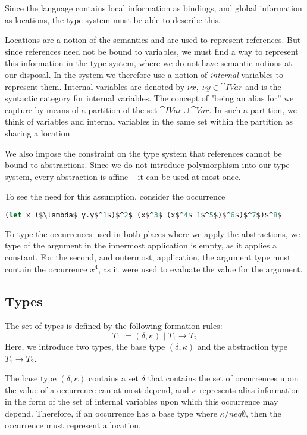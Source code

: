 \documentclass[acmsmall,sigplan]{acmart}
\begin{document}
Since the language contains local information as bindings, and global
information as locations, the type system must be able to describe
this.

Locations are a notion of the semantics and are used to represent
references. But since references need not be bound to variables, we
must find a way to represent this information in the type system,
where we do not have semantic notions at our disposal. In the system
we therefore use a notion of \emph{internal} variables to represent
them. Internal variables are denoted by $\nu x,\; \nu y\in\cat{IVar}$
and  is the syntactic category for internal variables. The
concept of "being an alias for'' we capture by means of a partition of
the set $\cat{IVar} \cup \cat{Var}$. In such a partition, we think of
variables and internal variables in the same set within the partition
as sharing a location.

We also impose the constraint on the type system that references
cannot be bound to abstractions.  Since we do not introduce
polymorphism into our type system, every abstraction is affine -- it
can be used at most once.

To see the need for this assumption, consider the occurrence
\begin{lstlisting}[language=Caml, mathescape=true]
(let x ($\lambda$ y.y$^1$)$^2$ (x$^3$ (x$^4$ 1$^5$)$^6$)$^7$)$^8$
\end{lstlisting}
To type the occurrences used in both places where we apply the
abstractions, we type of the argument in the innermost application is
empty, as it applies a constant. 
For the second, and outermost, application, the argument type must
contain the occurrence $x^4$, as it were used to evaluate the value
for the argument. 

\subsection{Types}\label{sec:types}

The set of types  is defined by the following formation rules:
%
\[ T ::=(\delta,\kappa)\mid T_1 \rightarrow T_2 \]
%
Here, we introduce two types, the base type $(\delta,\kappa)$ and the
abstraction type $T_1 \rightarrow T_2$.

The base type $(\delta,\kappa)$ contains a set $\delta$ that contains
the set of occurrences upon the value of a occurrence can at most
depend, and $\kappa$ represents alias information in the form of the
set of internal variables upon which this occurrence may
depend. Therefore, if an occurrence has a base type where
$\kappa/neq \emptyset$, then the occurrence must represent a location.
\end{document}
